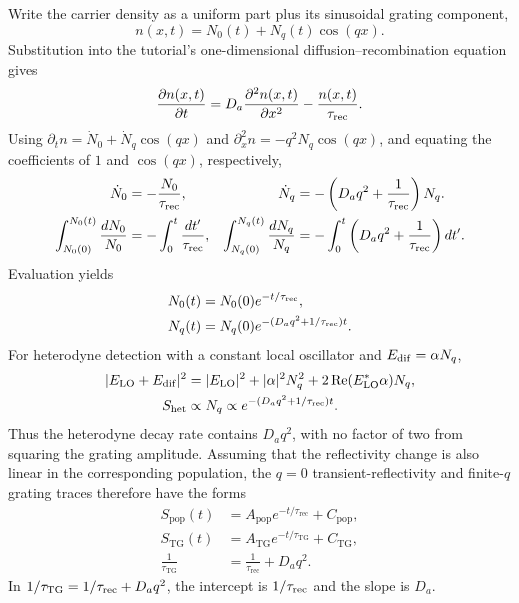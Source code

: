 \documentclass[11pt,a4paper]{article}
\begin{document}
Write the carrier density as a uniform part plus its sinusoidal grating component,
\begin{equation}
n(x,t)=N_0(t)+N_q(t)\cos(qx).
\end{equation}
Substitution into the tutorial's one-dimensional diffusion--recombination equation gives
\begin{equation}
\frac{\partial n(x,t)}{\partial t}=D_a\frac{\partial^2 n(x,t)}{\partial x^2}-\frac{n(x,t)}{\tau_{\rm rec}}.
\end{equation}
Using $\partial_t n=\dot N_0+\dot N_q\cos(qx)$ and $\partial_x^2n=-q^2N_q\cos(qx)$, and equating the coefficients of $1$ and $\cos(qx)$, respectively,
\begin{align}
\dot N_0&=-\frac{N_0}{\tau_{\rm rec}}, & \dot N_q&=-\left(D_aq^2+\frac{1}{\tau_{\rm rec}}\right)N_q.\\
\int_{N_0(0)}^{N_0(t)}\frac{dN_0}{N_0}&=-\int_0^t\frac{dt'}{\tau_{\rm rec}}, &
\int_{N_q(0)}^{N_q(t)}\frac{dN_q}{N_q}&=-\int_0^t\left(D_aq^2+\frac{1}{\tau_{\rm rec}}\right)dt'.
\end{align}
Evaluation yields
\begin{align}
N_0(t)&=N_0(0)e^{-t/\tau_{\rm rec}},\\
N_q(t)&=N_q(0)e^{-(D_aq^2+1/\tau_{\rm rec})t}.
\end{align}
For heterodyne detection with a constant local oscillator and $E_{\rm dif}=\alpha N_q$,
\begin{align}
|E_{\rm LO}+E_{\rm dif}|^2&=|E_{\rm LO}|^2+|\alpha|^2N_q^2
 +2\operatorname{Re}(E_{\rm LO}^*\alpha)N_q,\\
S_{\rm het}&\propto N_q\propto e^{-(D_aq^2+1/\tau_{\rm rec})t}.
\end{align}
Thus the heterodyne decay rate contains $D_aq^2$, with no factor of two from squaring the grating amplitude. Assuming that the reflectivity change is also linear in the corresponding population, the $q=0$ transient-reflectivity and finite-$q$ grating traces therefore have the forms
\begin{align}
 S_{\mathrm{pop}}(t)&=A_{\mathrm{pop}}e^{-t/\tau_{\mathrm{rec}}}+C_{\mathrm{pop}},\\
 S_{\mathrm{TG}}(t)&=A_{\mathrm{TG}}e^{-t/\tau_{\mathrm{TG}}}+C_{\mathrm{TG}},\\
 \frac{1}{\tau_{\mathrm{TG}}}&=\frac{1}{\tau_{\mathrm{rec}}}+D_aq^2.
\end{align}
In $1/\tau_{\rm TG}=1/\tau_{\rm rec}+D_aq^2$, the intercept is $1/\tau_{\rm rec}$ and the slope is $D_a$.
\end{document}

